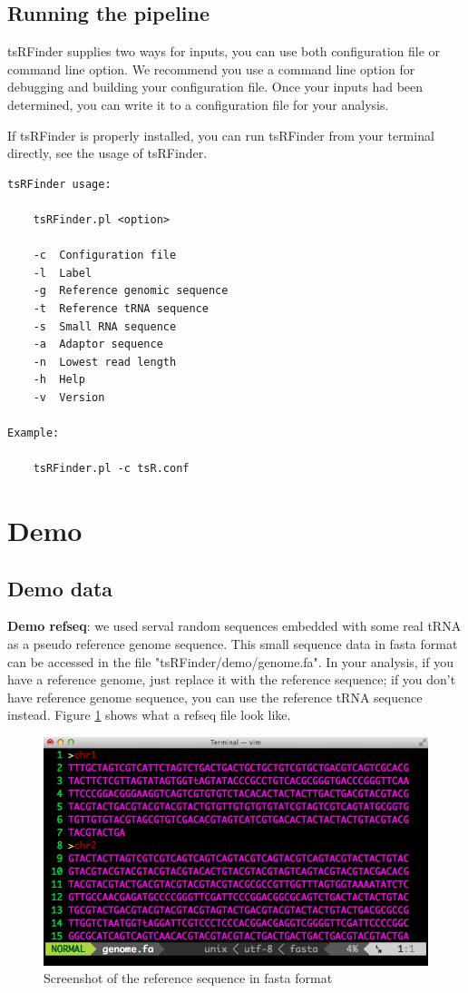 \documentclass[11pt, a4paper]{article}
\begin{document}
\subsection{Running the pipeline}

tsRFinder supplies two ways for inputs, you can use both configuration file or command line option. We recommend you use a command line option for debugging and building your configuration file. Once your inputs had been determined, you can write it to a configuration file for your analysis.

If tsRFinder is properly installed, you can run tsRFinder from your terminal directly, see the usage of tsRFinder.

{\small \begin{verbatim}
tsRFinder usage:

    tsRFinder.pl <option>

    -c  Configuration file
    -l  Label
    -g  Reference genomic sequence
    -t  Reference tRNA sequence
    -s  Small RNA sequence
    -a  Adaptor sequence
    -n  Lowest read length
    -h  Help
    -v  Version

Example:

    tsRFinder.pl -c tsR.conf
\end{verbatim}}

\section{Demo}

\subsection{Demo data}

\textbf{Demo refseq}: we used serval random sequences embedded with some real tRNA as a pseudo reference genome sequence. This small sequence data in fasta format can be accessed in the file "tsRFinder/demo/genome.fa". In your analysis, if you have a reference genome, just replace it with the reference sequence; if you don't have reference genome sequence, you can use the reference tRNA sequence instead. Figure \ref{refseq} shows what a refseq file look like.

\begin{figure}[htbp]
\begin{center}
\includegraphics[width=12cm]{refseq.png}
\caption{Screenshot of the reference sequence in fasta format} 
\label{refseq}
\end{center}
\end{figure}
\end{document}
